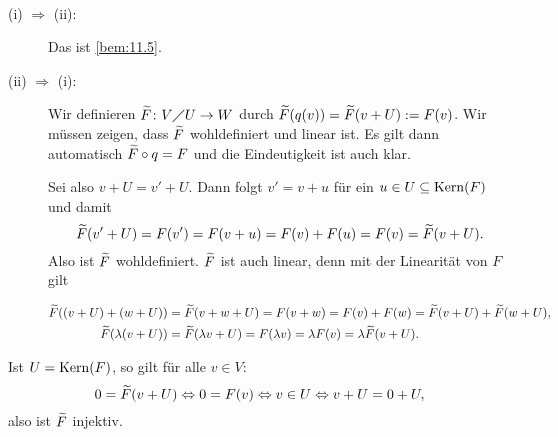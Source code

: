 \begin{beweis}
	\mbox{} \\[-.9cm]
	\begin{description}
		\item[(i) $\Rightarrow$ (ii):] Das ist \autoref{bem:11.5}.
		\item[(ii) $\Rightarrow$ (i):] Wir definieren $\widetilde{F}\colon V \diagup U \rightarrow W$ durch $\widetilde{F}(q(v)) = \widetilde{F}(v+U) := F(v)$.
		Wir müssen zeigen, dass $\widetilde{F}$ wohldefiniert und linear ist.
		Es gilt dann automatisch $\widetilde{F} \circ q = F$ und die Eindeutigkeit ist auch klar.
		
		Sei also $v + U = v' + U$.
		Dann folgt $v' = v+u$ für ein $u \in U \subseteq \operatorname{Kern}(F)$ und damit
		\[
			\widetilde{F}(v'+U) = F(v') = F(v+u) = F(v) + F(u) = F(v) = \widetilde{F}(v+U).
		\]
		Also ist $\widetilde{F}$ wohldefiniert.
		$\widetilde{F}$ ist auch linear, denn mit der Linearität von $F$ gilt
		\newpage
		
		\begin{align*}
			\widetilde{F}((v+U)+(w+U)) &= \widetilde{F}(v+w+U) = F(v+w) = F(v) + F(w) = \widetilde{F}(v+U) + \widetilde{F}(w+U), \\
			\widetilde{F}(\lambda(v+U)) &= \widetilde{F}(\lambda v + U) = F(\lambda v) =\lambda F(v) = \lambda \widetilde{F}(v+U).		
		\end{align*}
	\end{description}
	Ist $U = \operatorname{Kern}(F)$, so gilt für alle $v \in V$:
	\[
		0 = \widetilde{F}(v+U) \Leftrightarrow 0 = F(v) \Leftrightarrow v \in U \Leftrightarrow v + U = 0 + U,
	\]
	also ist $\widetilde{F}$ injektiv. \qedhere
\end{beweis}
